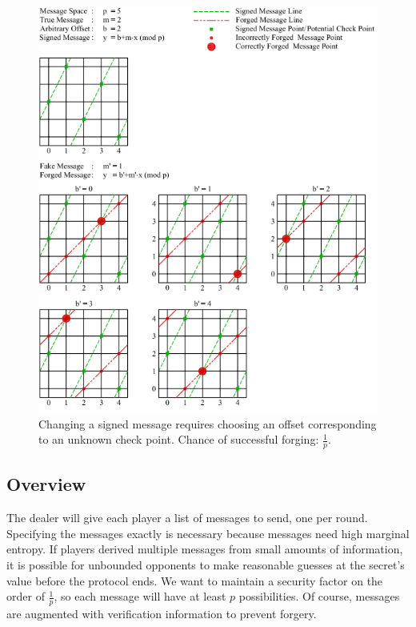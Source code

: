 \documentclass{dalcsthesis}
\begin{document}
\begin{figure}
\includegraphics[width=\textwidth]{../../Graphics/PointAndLineExample.png}
\caption{Changing a signed message requires choosing an offset corresponding to an unknown check point. Chance of successful forging: $\frac{1}{p}$.}
\label{img:ForgingVerifiableMessageForUnbounded}
\end{figure}

\subsection{Overview}

The dealer will give each player a list of messages to send, one per round. Specifying the messages exactly is necessary because messages need high marginal entropy. If players derived multiple messages from small amounts of information, it is possible for unbounded opponents to make reasonable guesses at the secret's value before the protocol ends. We want to maintain a security factor on the order of $\frac{1}{p}$, so each message will have at least $p$ possibilities. Of course, messages are augmented with verification information to prevent forgery.
\end{document}
